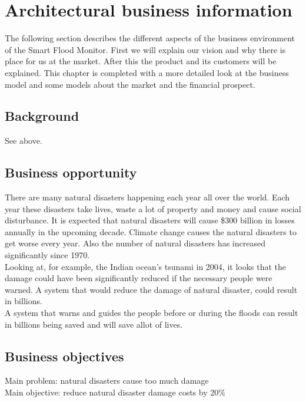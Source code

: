 \chapter{Architectural business information}
\label{ch:business}
The following section describes the different aspects of the business environment of the Smart Flood Monitor. First we will explain our vision and why there is place for us at the market. After this the product and its customers will be explained. This chapter is completed with a more detailed look at the business model and some models about the market and the financial prospect.


\section{Background}
See above. 

\section{Business opportunity}
There are many natural disasters happening each year all over the world. Each year these disasters take lives, waste a lot of property and money and cause social disturbance. It is expected that natural disasters will cause \$300 billion in losses annually in the upcoming decade. Climate change causes the natural disasters to get worse every year. Also the number of natural disasters has increased significantly since 1970.\\
Looking at, for example, the Indian ocean's tsunami in 2004, it looks that the damage could have been significantly reduced if the necessary people were warned. A system that would reduce the damage of natural disaster, could result in billions. \\
A system that warns and guides the people before or during the floods can result in billions being saved and will save allot of lives.


\section{Business objectives}
Main problem: natural disasters cause too much damage\\
Main objective: reduce natural disaster damage costs by 20\%

